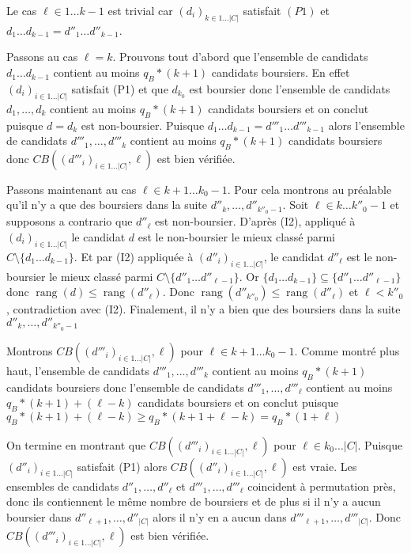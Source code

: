 \documentclass{article}
\DeclareMathOperator{\rang}{rang}
\begin{document}
\begin{itemize}
\medskip

Le cas $\ell\in 1\ldots k-1$ est trivial car  $(d_i)_{k\in 1 \ldots |C|}$ satisfait $(P1)$
et $d_1\ldots d_{k-1} = d''_1\ldots d''_{k-1}$.

\medskip

Passons au cas $\ell = k$.
Prouvons tout d'abord que 
l'ensemble de candidats $d_1 \ldots d_{k-1}$ contient au moins $q_B  * (k+1)$  candidats boursiers.
En effet $(d_i)_{i\in 1\ldots |C|}$ satisfait (P1) et que
$d_{k_0}$ est boursier donc
l'ensemble de candidats $d_1,\ldots,d_{k}$ contient au moins $q_B  * (k+1)$  candidats boursiers
et on conclut puisque $d=d_k$ est non-boursier.
Puisque $d_1 \ldots d_{k-1}=d'''_1\ldots d'''_{k-1}$ alors
l'ensemble de candidats $d'''_1,\ldots,d'''_{k}$ contient au moins $q_B  * (k+1)$  candidats boursiers
donc $CB((d'''_i)_{i\in 1\ldots |C|},\ell)$ est bien vérifiée.

\medskip

Passons maintenant au cas $\ell \in k+1\ldots k_0-1$.
Pour cela montrons au préalable qu'il n'y a que des boursiers dans la suite
$d''_k,\ldots,d''_{k''_0-1}$.
Soit $\ell \in k\ldots k''_0-1$ et supposons a contrario que $d''_\ell$ 
est non-boursier.
D'après (I2), appliqué à $(d_i)_{i\in 1\ldots |C|}$
le candidat $d$ est le non-boursier le mieux classé 
parmi $C \setminus \{d_1\ldots d_{k-1}\}$.
Et par (I2) appliquée à $(d''_i)_{i\in 1\ldots |C|}$,
le candidat $d''_\ell$ est le non-boursier le mieux classé
parmi $C \setminus \{d''_1\ldots d''_{\ell-1}\}$.
Or $\{d_1\ldots d_{k-1}\}\subseteq \{d''_1\ldots d''_{\ell-1}\}$
donc $\rang(d)\leq \rang(d''_\ell)$.
Donc $\rang(d''_{k''_0}) \leq \rang(d''_\ell)$ et $\ell < k''_0$,
contradiction avec (I2).
Finalement, il n'y a bien que des boursiers dans la suite
$d''_k,\ldots,d''_{k''_0-1}$

Montrons $CB((d'''_i)_{i\in 1\ldots |C|},\ell)$
pour $\ell \in k+1\ldots k_0-1$.
Comme montré plus haut,
l'ensemble de candidats $d'''_1,\ldots,d'''_{k}$ contient au moins $q_B  * (k+1)$  candidats boursiers
donc l'ensemble de candidats $d'''_1,\ldots,d'''_{\ell}$ contient au moins 
$q_B  * (k+1) + (\ell - k)$  candidats boursiers et on conclut puisque
$q_B  * (k+1) + (\ell - k) \geq q_B  * (k+1 + \ell - k) = q_B  * (1 + \ell)$

\medskip

On termine en montrant que
 $CB((d'''_i)_{i\in 1\ldots |C|},\ell)$
pour $\ell \in k_0\ldots |C|$.
Puisque $(d''_i)_{i\in 1\ldots |C|}$ satisfait (P1)
alors $CB((d''_i)_{i\in 1\ldots |C|},\ell)$ est vraie.
Les ensembles de candidats $d''_1,\ldots,d''_{\ell}$ et $d'''_1,\ldots,d'''_{\ell}$
coincident à permutation près, donc ils contiennent le même nombre de boursiers
et de plus si il n'y a aucun boursier dans $d''_{\ell+1},\ldots,d''_{|C|}$
alors il n'y en a aucun dans $d'''_{\ell+1},\ldots,d'''_{|C|}$.
Donc $CB((d'''_i)_{i\in 1\ldots |C|},\ell)$ est bien vérifiée.

\end{itemize}



 
  
 
\end{document}
